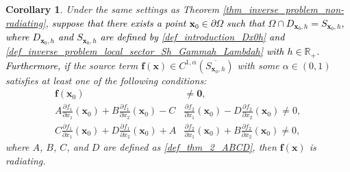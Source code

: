 \documentclass[11pt,reqno,oneside]{amsart}
\newtheorem{corollary}[theorem]{Corollary}
\theoremstyle{definition}
\theoremstyle{remark}
\numberwithin{equation}{section}
\numberwithin{equation}{section}
\theoremstyle{remark}
\begin{document}
\begin{corollary} \label{cor_inverse_problem_radiating}
	Under the same settings as Theorem \ref{thm_inverse_problem_non-radiating}, \textcolor{black}{suppose that there exists a point $ \mathbf{x}_0\in\partial\Omega $ such that $ \Omega\cap D_{\mathbf{x}_0, h}=S_{\mathbf{x}_0, h} $, where $ D_{\mathbf{x}_0, h} $ and $ S_{\mathbf{x}_0, h} $ are defined by \eqref{def_introduction_Dx0h} and \eqref{def_inverse_problem_local_sector_Sh_Gammah_Lambdah} with $ h\in\mathbb{R}_+ $. Furthermore,} if the source term $ \mathbf{f}\left(\mathbf{x}\right) \in C^{1,\alpha} \left(\overline{S_{\mathbf{x}_0,h}}\right) $ with 	some $ \alpha \in \left(0,1\right) $ satisfies at least one of the following conditions:
	\begin{align} 
		\label{eq:1.13}
		\mathbf{f} \left(\mathbf{x}_0\right) &\neq \bm{0}, \\
		\label{eq:1.14}
		A \frac{\partial f_1}{\partial x_1}\left(\mathbf{x}_0\right) + B \frac{\partial f_1}{\partial x_2}\left(\mathbf{x}_0\right) - C& \frac{\partial f_2}{\partial x_1}\left(\mathbf{x}_0\right) - D \frac{\partial f_2}{\partial x_2}\left(\mathbf{x}_0\right) \neq 0 , \\
		\label{eq:1.15}
		C \frac{\partial f_1}{\partial x_1}\left(\mathbf{x}_0\right) + D \frac{\partial f_1}{\partial x_2}\left(\mathbf{x}_0\right) + A& \frac{\partial f_2}{\partial x_1}\left(\mathbf{x}_0\right) + B \frac{\partial f_2}{\partial x_2}\left(\mathbf{x}_0\right) \neq 0 ,
	\end{align}	
	where $ A $, $ B $, $ C $, and $ D $ are defined as \eqref{def_thm_2_ABCD}, then $ \mathbf{f}\left(\mathbf{x}\right) $ is radiating.
\end{corollary}
\end{document}
